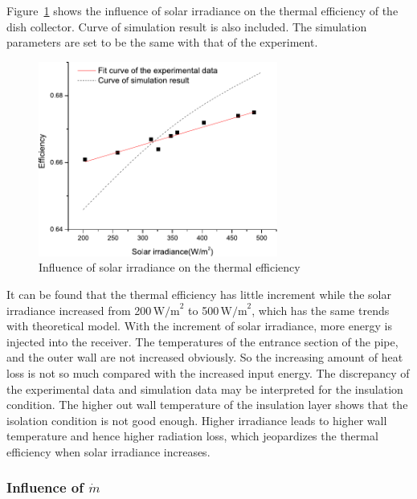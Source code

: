 Figure~\ref{fig:I_r-eta} shows the influence of solar irradiance on the thermal efficiency of the dish collector. Curve of simulation result is also included. The simulation parameters are set to be the same with that of the experiment. 
\begin{figure}[!ht]
\centering
\includegraphics[width=0.7\textwidth]{fig/I_r-eta}
\caption{Influence of solar irradiance on the thermal efficiency}
\label{fig:I_r-eta}
\end{figure}

It can be found that the thermal efficiency has little increment while the solar irradiance increased from 200$\,\mathrm{W/m}^2$ to 500$\,\mathrm{W/m}^2$, which has the same trends with theoretical model. With the increment of solar irradiance, more energy is injected into the receiver. The temperatures of the entrance section of the pipe, and the outer wall are not increased obviously. So the increasing amount of heat loss is not so much compared with the increased input energy. 
The discrepancy of the experimental data and simulation data may be interpreted for the insulation condition. The higher out wall temperature of the insulation layer shows that the isolation condition is not good enough. Higher irradiance leads to higher wall temperature and hence higher radiation loss, which jeopardizes the thermal efficiency when solar irradiance increases.


\subsubsection{Influence of $\dot{m}$}


